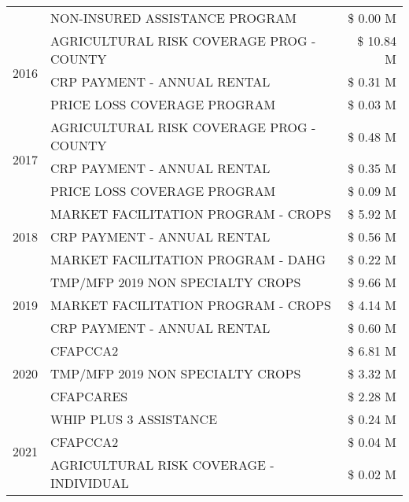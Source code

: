 \begin{tabular}{llr}
 & NON-INSURED ASSISTANCE PROGRAM & \$ 0.00 M \\
\cline{1-3}
\multirow[t]{3}{*}{2016} & AGRICULTURAL RISK COVERAGE PROG - COUNTY      & \$ 10.84 M \\
 & CRP PAYMENT - ANNUAL RENTAL                   & \$ 0.31 M \\
 & PRICE LOSS COVERAGE PROGRAM                   & \$ 0.03 M \\
\cline{1-3}
\multirow[t]{3}{*}{2017} & AGRICULTURAL RISK COVERAGE PROG - COUNTY & \$ 0.48 M \\
 & CRP PAYMENT - ANNUAL RENTAL & \$ 0.35 M \\
 & PRICE LOSS COVERAGE PROGRAM & \$ 0.09 M \\
\cline{1-3}
\multirow[t]{3}{*}{2018} & MARKET FACILITATION PROGRAM - CROPS & \$ 5.92 M \\
 & CRP PAYMENT - ANNUAL RENTAL & \$ 0.56 M \\
 & MARKET FACILITATION PROGRAM - DAHG & \$ 0.22 M \\
\cline{1-3}
\multirow[t]{3}{*}{2019} & TMP/MFP 2019 NON SPECIALTY CROPS & \$ 9.66 M \\
 & MARKET FACILITATION PROGRAM - CROPS & \$ 4.14 M \\
 & CRP PAYMENT - ANNUAL RENTAL & \$ 0.60 M \\
\cline{1-3}
\multirow[t]{3}{*}{2020} & CFAPCCA2 & \$ 6.81 M \\
 & TMP/MFP 2019 NON SPECIALTY CROPS & \$ 3.32 M \\
 & CFAPCARES & \$ 2.28 M \\
\cline{1-3}
\multirow[t]{3}{*}{2021} & WHIP PLUS 3 ASSISTANCE & \$ 0.24 M \\
 & CFAPCCA2 & \$ 0.04 M \\
 & AGRICULTURAL RISK COVERAGE - INDIVIDUAL & \$ 0.02 M \\
\cline{1-3}
\bottomrule
\end{tabular}
